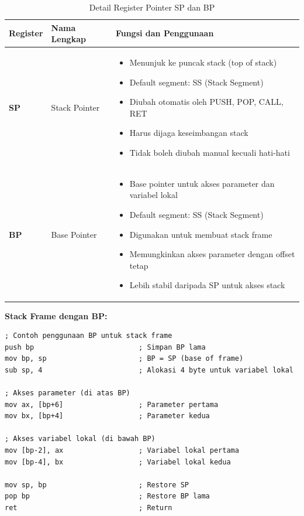 \documentclass[../main.tex]{subfiles}
\begin{document}
\begin{table}[H]
    \centering
    \caption{Detail Register Pointer SP dan BP}
    \begin{tabular}{|p{1.8cm}|p{3.2cm}|p{7.2cm}|}
        \hline
        \textbf{Register} & \textbf{Nama Lengkap} & \textbf{Fungsi dan Penggunaan} \\
        \hline
        \textbf{SP} & Stack Pointer & \begin{itemize}
        \item Menunjuk ke puncak stack (top of stack)
        \item Default segment: SS (Stack Segment)
        \item Diubah otomatis oleh PUSH, POP, CALL, RET
        \item Harus dijaga keseimbangan stack
        \item Tidak boleh diubah manual kecuali hati-hati
        \end{itemize} \\
        \hline
        \textbf{BP} & Base Pointer & \begin{itemize}
        \item Base pointer untuk akses parameter dan variabel lokal
        \item Default segment: SS (Stack Segment)
        \item Digunakan untuk membuat stack frame
        \item Memungkinkan akses parameter dengan offset tetap
        \item Lebih stabil daripada SP untuk akses stack
        \end{itemize} \\
        \hline
    \end{tabular}
    \label{tab:pointer-registers-detail}
\end{table}

\textbf{Stack Frame dengan BP:}
\begin{lstlisting}[language={[x86masm]Assembler}, caption=Stack Frame dengan Base Pointer, label=lst:stack-frame]
; Contoh penggunaan BP untuk stack frame
push bp                         ; Simpan BP lama
mov bp, sp                      ; BP = SP (base of frame)
sub sp, 4                       ; Alokasi 4 byte untuk variabel lokal

; Akses parameter (di atas BP)
mov ax, [bp+6]                  ; Parameter pertama
mov bx, [bp+4]                  ; Parameter kedua

; Akses variabel lokal (di bawah BP)
mov [bp-2], ax                  ; Variabel lokal pertama
mov [bp-4], bx                  ; Variabel lokal kedua

mov sp, bp                      ; Restore SP
pop bp                          ; Restore BP lama
ret                             ; Return
\end{lstlisting}
\end{document}
